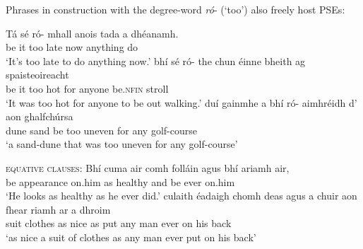 \documentclass[output=paper,colorlinks,citecolor=brown]{langscibook}
\begin{document}
Phrases in construction with the degree-word {\itshape ró}- (`too') also freely host PSEs:

\ea
\ea
\gll Tá sé ró- mhall anois tada a dhéanamh. \\
     {be\pres} it too late now anything {\vce} {do\vn} \\
\glt `It's too late to do anything now.'
\ex
\gll bhí sé ró- the chun éinne bheith ag spaisteoireacht \\ %
     {be\past} it too hot for anyone {be.\textsc{nfin}} {\prog} {stroll\vn} \\  %
\glt `It was too hot for anyone to be out walking.'
\ex
\gll duí gainmhe a bhí ró- aimhréidh d' aon ghalfchúrsa \\
     dune {sand\gen} {\go} {be\past} too uneven for any golf-course \\
\glt `a sand-dune that was too uneven for any golf-course'
\z
\z


\ea
\textsc{equative clauses}:
\ea
\gll Bhí cuma air comh folláin agus bhí ariamh air, \\
    {be\past} appearance on.him as healthy and {be\past} ever on.him \\
\glt `He looks as healthy as he ever did.'
\ex
\gll culaith éadaigh chomh deas agus a chuir aon fhear riamh ar a dhroim \\
     suit {clothes\gen} as nice as {\aLgloss} {put\past} any man ever on his back \\
\glt `as nice a suit of clothes as any man ever put on his back'
\z
\z
\end{document}
